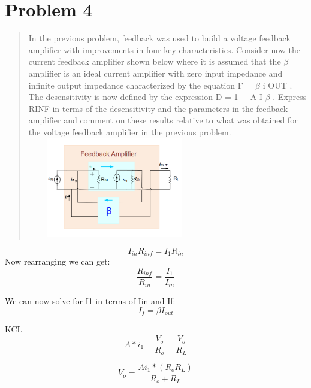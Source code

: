 \documentclass[10pt,a4paper]{article}
\begin{document}
\section{Problem 4}
\begin{quote}
In the previous problem, feedback was used to build a voltage
feedback amplifier with improvements in four key characteristics.
Consider now the current feedback amplifier shown below where it is
assumed that the $\beta$ amplifier is an ideal current amplifier with zero
input impedance and infinite output impedance characterized by the
equation F = $\beta$ i OUT . The desensitivity is now defined by the
expression D = 1 + A I $\beta$ . Express RINF in terms of the desensitivity and the
parameters in the feedback amplifier and comment on these results relative to what was
obtained for the voltage feedback amplifier in the previous problem.
\includegraphics[width=2.99028in,height=1.71667in]{images/problem4.png}\\

\end{quote}

\begin{equation}
I_{in} R_{inf} = I_{1} R_{in}
\end{equation}
Now rearranging we can get:\\
\begin{equation}
\frac{R_{inf}}{R_{in}} = \frac{I_{1}}{I_{in}}
\end{equation}

We can now solve for I1 in terms of Iin and If: 
\begin{equation}
\label{eq:VF}
I_f = \beta I_{out}
\end{equation}

KCL
\begin{equation}
\label{eq:VOUT}
 A * i_1 - \frac{V_{o}}{R_o} - \frac{V_{o}}{R_L}
\end{equation}

\begin{equation}
\label{eq:VOUT}
V_{o} = \frac{A i_1 *(R_o R_L)}{R_o + R_L}
\end{equation}
\end{document}
